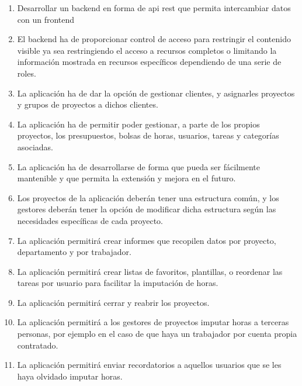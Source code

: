 \begin{enumerate}
\label{enum:req:lis}
 \item Desarrollar un \gls{backend} en forma de \gls{api} \gls{rest} que
 permita intercambiar datos con un \gls{frontend}

 \item El \gls{backend} ha de proporcionar control de acceso para restringir el
 contenido visible \textemdash ya sea restringiendo el acceso a recursos
 completos o limitando la información mostrada en recursos específicos
 \textemdash dependiendo de una serie de roles.
 
 \item La aplicación ha de dar la opción de gestionar clientes, y asignarles
 proyectos y grupos de proyectos a dichos clientes.
 
 \item La aplicación ha de permitir poder gestionar, a parte de los propios 
 proyectos, los presupuestos, bolsas de horas, usuarios, tareas y categorías 
 asociadas.
 
 \item La aplicación ha de desarrollarse de forma que pueda ser fácilmente 
 mantenible y que permita la extensión y mejora en el futuro.

 \item Los proyectos de la aplicación deberán tener una estructura común, y
 los gestores deberán tener la opción de modificar dicha estructura según
 las necesidades específicas de cada proyecto.

 \item La aplicación permitirá crear informes que recopilen datos por proyecto,
 departamento y por trabajador.

 \item La aplicación permitirá crear listas de favoritos, plantillas, o
 reordenar las tareas por usuario para facilitar la imputación de horas.

 \item La aplicación permitirá cerrar y reabrir los proyectos.

 \item La aplicación permitirá a los gestores de proyectos imputar horas a
 terceras personas, por ejemplo en el caso de que haya un trabajador por cuenta
 propia contratado.
 
 \item La aplicación permitirá enviar recordatorios a aquellos usuarios que
 se les haya olvidado imputar horas.


\end{enumerate}
